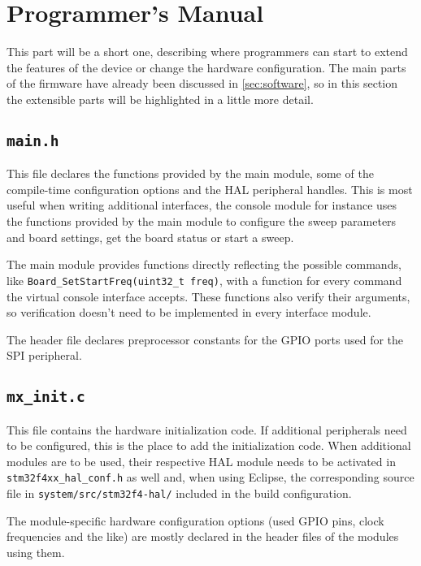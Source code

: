 \chapter{Programmer's Manual} \label{sec:api}

This part will be a short one, describing where programmers can start to extend the features of the device or
change the hardware configuration.
The main parts of the firmware have already been discussed in \autoref{sec:software}, so in this section
the extensible parts will be highlighted in a little more detail.


\section{\texttt{main.h}}

This file declares the functions provided by the main module, some of the compile-time configuration options and the
HAL peripheral handles. This is most useful when writing additional interfaces, the console module for instance uses
the functions provided by the main module to configure the sweep parameters and board settings, get the board status
or start a sweep.

The main module provides functions directly reflecting the possible commands, like
\verb!Board_SetStartFreq(uint32_t freq)!, with a function for every command the virtual console interface accepts.
These functions also verify their arguments, so verification doesn't need to be implemented in every interface module.

The header file declares preprocessor constants for the GPIO ports used for the SPI peripheral.


\section{\texttt{mx\_init.c}}

This file contains the hardware initialization code. If additional peripherals need to be configured, this is the
place to add the initialization code. When additional modules are to be used, their respective HAL module needs
to be activated in \verb!stm32f4xx_hal_conf.h! as well and, when using Eclipse, the corresponding source file in
\verb!system/src/stm32f4-hal/! included in the build configuration.

The module-specific hardware configuration options (used GPIO pins, clock frequencies and the like) are mostly declared
in the header files of the modules using them.


